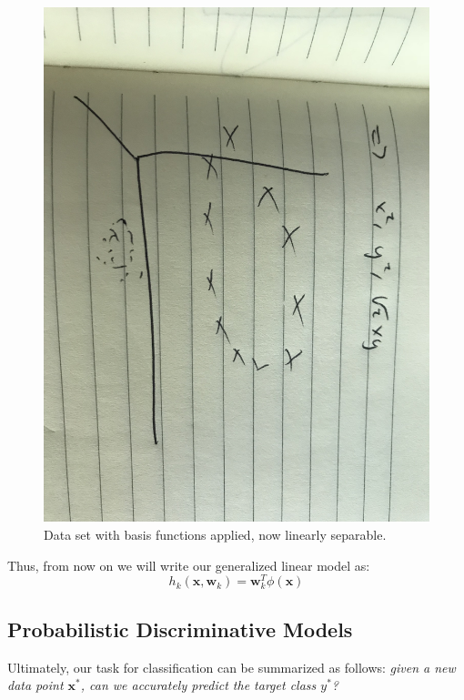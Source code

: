 \begin{figure}
    \centering
    \includegraphics[width=0.5\paperwidth]{../Classification/fig/circles_with_basis_change.jpg}
    \caption{Data set with basis functions applied, now linearly separable.}
    \label{fig:circles-with-basis-change}
\end{figure}

Thus, from now on we will write our generalized linear model as:
\begin{equation} \label{basis-changed-linear-model}
	h_{k}(\textbf{x}, \textbf{w}_{k}) = \textbf{w}_{k}^{T}\phi{(\textbf{x})}
\end{equation}

\subsection{Probabilistic Discriminative Models}
Ultimately, our task for classification can be summarized as follows: \textit{given a new data point $\textbf{x}^{*}$, can we accurately predict the target class $y^{*}$?}

